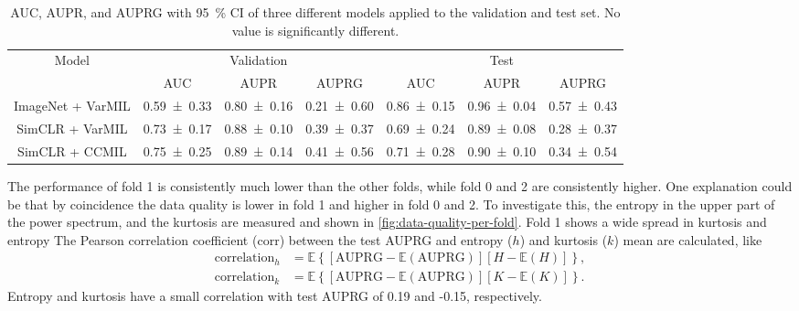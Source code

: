 \begin{table}
    \caption[AUC, AUPR, and AUPRG]{AUC, AUPR, and AUPRG with \qty{95}{\percent} CI of three different models applied to the validation and test set.
    No value is significantly different.}
    \label{tab:performance}
    \begin{tabular*}{\linewidth}{@{\extracolsep{\fill}}*{7}{c}}
        \toprule
        \multirow{2}{*}{Model} & \multicolumn{3}{c}{Validation} & \multicolumn{3}{c}{Test} \\
        \cmidrule{2-4} \cmidrule{5-7}
        & AUC & AUPR & AUPRG & AUC & AUPR & AUPRG \\
        \midrule
        ImageNet + VarMIL & \num{0.59 \pm 0.33} & \num{0.80 \pm 0.16} & \num{0.21 \pm 0.60} & \num{0.86 \pm 0.15} & \num{0.96 \pm 0.04} & \num{0.57 \pm 0.43} \\
        SimCLR + VarMIL & \num{0.73 \pm 0.17} & \num{0.88 \pm 0.10} & \num{0.39 \pm 0.37} & \num{0.69 \pm 0.24} & \num{0.89 \pm 0.08} & \num{0.28 \pm 0.37} \\
        SimCLR + CCMIL & \num{0.75 \pm 0.25} & \num{0.89 \pm 0.14} & \num{0.41 \pm 0.56} & \num{0.71 \pm 0.28} & \num{0.90 \pm 0.10} & \num{0.34 \pm 0.54} \\
        \bottomrule
    \end{tabular*}
\end{table}

The performance of fold 1 is consistently much lower than the other folds, while fold 0 and 2 are consistently higher.
One explanation could be that by coincidence the data quality is lower in fold 1 and higher in fold 0 and 2.
To investigate this, the entropy in the upper part of the power spectrum, and the kurtosis are measured and shown in \cref{fig:data-quality-per-fold}.
Fold 1 shows a wide spread in kurtosis and entropy
The Pearson correlation coefficient ($\mathrm{corr}$) between the test AUPRG and entropy ($h$) and kurtosis ($k$) mean are calculated, like
\begin{align}
    \mathrm{correlation}_h &= \mathbb{E}\left\{[\mathrm{AUPRG} - \mathbb{E}\left(\mathrm{AUPRG} \right)][H - \mathbb{E}\left(H\right)]\right\}, \\
    \mathrm{correlation}_k &= \mathbb{E}\left\{[\mathrm{AUPRG} - \mathbb{E}\left(\mathrm{AUPRG} \right)][K - \mathbb{E}\left(K\right)]\right\}.
\end{align}
Entropy and kurtosis have a small correlation with test AUPRG of 0.19 and -0.15, respectively.

